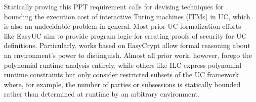 Statically proving this PPT requirement calls for devising techniques for bounding the execution cost of interactive Turing machines (ITMs) in UC,
which is also an undecidable problem in general.
Most prior UC formalization efforts like EasyUC aim to provide program logic for creating proofs of security for UC definitions\cite{ipdl,barbosa,easyuc}. 
Particularly, works based on EasyCrypt \cite{easyuc,barbosa} allow formal reasoning about an environment's power to distinguish.
Almost all prior work, however, forego the polynomial runtime analysis entirely, while others like ILC express polynomial runtime constraints but only consider restricted subsets of the UC framework where, for example, the number of parties or subsessions is statically bounded rather than determined at runtime by an arbitrary environment.


%


